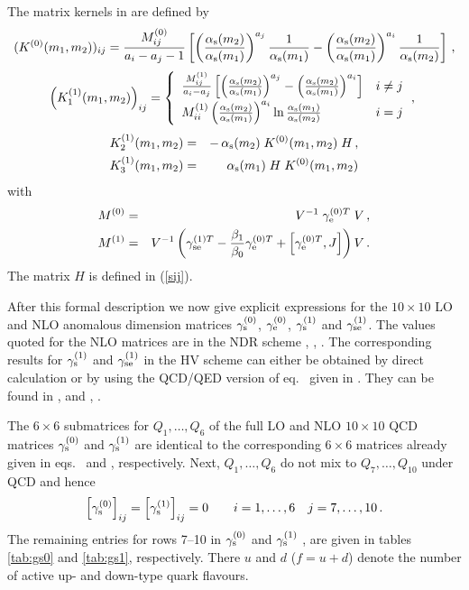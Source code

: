 The matrix kernels in  are defined by
\begin{equation}
(K^{(0)}(m_1,m_2))_{ij} = \frac{M^{(0)}_{ij}}{a_i - a_j - 1}
\left[
\left( \frac{\alpha_{\rm s}(m_2)}{\alpha_{\rm s}(m_1)} \right)^{a_j} \frac{1}{\alpha_{\rm s}(m_1)} -
\left( \frac{\alpha_{\rm s}(m_2)}{\alpha_{\rm s}(m_1)} \right)^{a_i} \frac{1}{\alpha_{\rm s}(m_2)}
\right] \, ,
\label{eq:K0}
\end{equation}
\begin{equation}
\left( \hK_1^{(1)}(m_1,m_2) \right)_{ij} =
\left\{
\begin{array}{ll}
\frac{M^{(1)}_{ij}}{a_i - a_j}
\left[ \left( \frac{\as(m_2)}{\as(m_1)} \right)^{a_j} -
       \left( \frac{\as(m_2)}{\as(m_1)} \right)^{a_i} \right] & i \not= j \\
\svs
M^{(1)}_{ii} \left( \frac{\as(m_2)}{\as(m_1)} \right)^{a_i}
             \ln\frac{\as(m_1)}{\as(m_2)}             & i=j
\end{array} \, ,
\right.
\label{eq:K11}
\end{equation}
\begin{eqnarray}
K_2^{(1)}(m_1,m_2) & = &
-\,\alpha_{\rm s}(m_2) \; K^{(0)}(m_1,m_2) \; H \, ,
\label{eq:K12} \\
K_3^{(1)}(m_1,m_2) & = &
\phantom{-}\,\alpha_{\rm s}(m_1) \; H \; K^{(0)}(m_1,m_2)
\label{eq:K13}
\end{eqnarray}
with
\begin{eqnarray}
M^{(0)} &=& V^{-1} \; \gamma_{\rm e}^{(0) T} \; V \, ,
\nonumber \\
M^{(1)} &=&
V^{-1} \left( \gamma_{\rm se}^{(1) T} - \frac{\beta_1}{\beta_0} \gamma_{\rm e}^{(0) T} +
                \left[ \gamma_{\rm e}^{(0) T}, J \right] \right) V \, .
\label{eq:M0M1}
\end{eqnarray}
The matrix $H$ is defined in (\ref{sij}).

After this formal description we now give explicit expressions for the
$10 \times 10$ LO and NLO anomalous dimension matrices $\gamma_{\rm s}^{(0)}$, $\gamma_{\rm e}^{(0)}$,
$\gamma_{\rm s}^{(1)}$ and $\gamma_{\rm se}^{(1)}$. The values quoted for the NLO matrices are in the
NDR scheme \cite{burasetal:92b}, \cite{burasetal:92c},
\cite{ciuchini:93}.  The corresponding results for $\gamma_{\rm s}^{(1)}$ and $\gamma_{\rm se}^{(1)}$ in
the HV scheme can either be obtained by direct calculation or by using
the QCD/QED version of eq.\  given in \cite{burasetal:92c}.
They can be found in \cite{burasetal:92b}, \cite{burasetal:92c}
and \cite{ciuchini:92}, \cite{ciuchini:93}.

The $6 \times 6$ submatrices for $Q_1,\ldots,Q_6$ of the full LO and
NLO $10 \times 10$ QCD matrices $\gamma_{\rm s}^{(0)}$ and $\gamma_{\rm s}^{(1)}$ are identical to the
corresponding $6 \times 6$ matrices already given in
eqs.\  and , respectively. Next,
$Q_1,\ldots,Q_6$ do not mix to $Q_7,\ldots,Q_{10}$ under QCD and hence
\begin{equation}
\left[ \gamma_{\rm s}^{(0)} \right]_{ij} = \left[ \gamma_{\rm s}^{(1)} \right]_{ij} = 0
\qquad
i=1,\ldots,6
\quad
j=7,\ldots,10 \, .
\label{eq:gs01ij}
\end{equation}
The remaining entries for rows 7--10 in $\gamma_{\rm s}^{(0)}$ \cite{bijnenswise:84} and
$\gamma_{\rm s}^{(1)}$ \cite{burasetal:92b}, \cite{ciuchini:93} are given in tables
\ref{tab:gs0} and \ref{tab:gs1}, respectively. There $u$ and $d$
($f=u+d$) denote the number of active up- and down-type quark
flavours.

